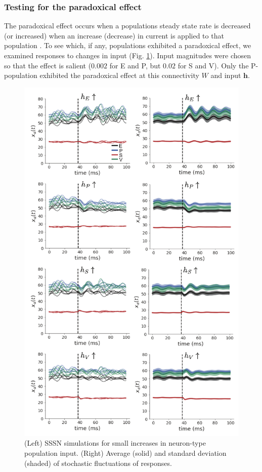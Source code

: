 \documentclass[11pt]{article}
\begin{document}
\subsubsection{Testing for the paradoxical effect}
The paradoxical effect occurs when a populations steady state rate is decreased (or increased) when an increase (decrease) in current is applied to that population \cite{tsodyks1997paradoxical}.
To see which, if any, populations exhibited a paradoxical effect, we examined responses to changes in input (Fig. \ref{fig:V1_4}).
Input magnitudes were chosen so that the effect is salient ($0.002$ for E and P, but $0.02$ for S and V).
Only the P-population exhibited the paradoxical effect at this connectivity $W$ and input $\mathbf{h}$.

\begin{figure}
\begin{center}
\includegraphics[scale=.8]{figures/figV1_1/figV1_1.pdf}
\end{center}
\caption{(Left) SSSN simulations for small increases in neuron-type population input.
(Right) Average (solid) and standard deviation (shaded) of stochastic fluctuations of responses.
 }
 \label{fig:V1_4}
\end{figure}
\end{document}
